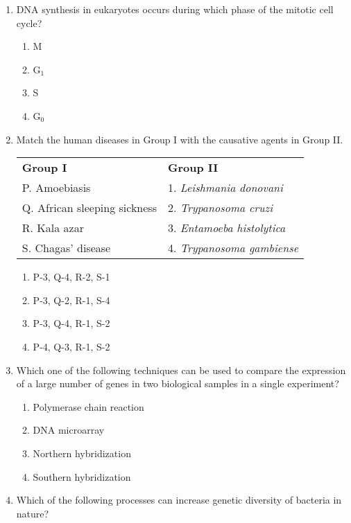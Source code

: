 \documentclass[12pt]{article}
\begin{document}
\begin{enumerate}[label=Q.\arabic*]
	\item DNA synthesis in eukaryotes occurs during which phase of the mitotic cell cycle?
		\begin{multicols}{4}
			\begin{enumerate}[label=(\Alph*)]
				\item M
				\item G$_1$
				\item S
				\item G$_0$
			\end{enumerate}
		\end{multicols}

	\item Match the human diseases in Group I with the causative agents in Group II.

		\begin{center}
			\begin{tabular}{ll}
				\textbf{Group I} & \textbf{Group II} \\
				P. Amoebiasis & 1. \textit{Leishmania donovani} \\
				Q. African sleeping sickness & 2. \textit{Trypanosoma cruzi} \\
				R. Kala azar & 3. \textit{Entamoeba histolytica} \\
				S. Chagas’ disease & 4. \textit{Trypanosoma gambiense} \\
			\end{tabular}
		\end{center}

		\begin{multicols}{2}
			\begin{enumerate}[label=(\Alph*)]
				\item P-3, Q-4, R-2, S-1 
				\item P-3, Q-2, R-1, S-4 
				\item P-3, Q-4, R-1, S-2 
				\item P-4, Q-3, R-1, S-2
			\end{enumerate}
		\end{multicols}

	\item Which one of the following techniques can be used to compare the expression of a large number of genes in two biological samples in a single experiment?
		\begin{multicols}{2}
			\begin{enumerate}[label=(\Alph*)]
				\item Polymerase chain reaction
				\item DNA microarray
				\item Northern hybridization
				\item Southern hybridization
			\end{enumerate}
		\end{multicols}
	\item Which of the following processes can increase genetic diversity of bacteria in nature?


\end{enumerate}
\end{document}
